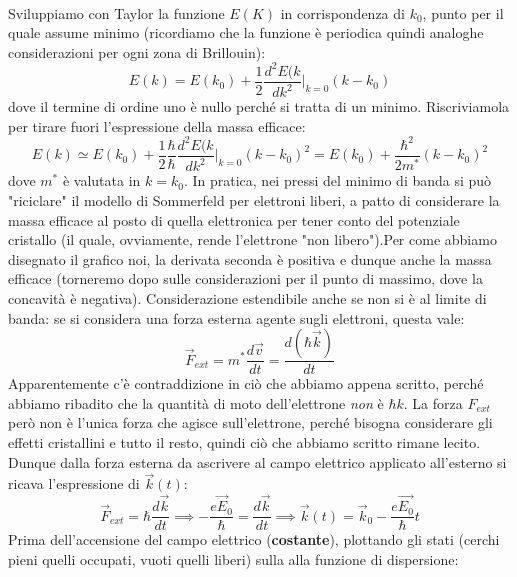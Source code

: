 \documentclass{book}
\begin{document}
                    \paragraph{}
                        Sviluppiamo con Taylor la funzione $E(K)$ in corrispondenza di $k_{0}$, punto per il quale assume minimo (ricordiamo che la funzione è periodica quindi analoghe considerazioni per ogni zona di Brillouin):
                        $$E(k) = E(k_{0}) + \frac{1}{2} \frac{d^{2}E(k}{dk^{2}}|_{k=0} (k-k_{0}) $$
                        dove il termine di ordine uno è nullo perché si tratta di un minimo.
                        Riscriviamola per tirare fuori l'espressione della massa efficace:
                        $$E(k) \simeq E(k_{0}) + \frac{1}{2}  \frac{\hbar}{\hbar}\frac{d^{2}E(k}{dk^{2}}|_{k=0} (k-k_{0})^{2} = E(k_{0}) + \frac{\hbar ^{2}}{2m^{*}}(k-k_{0})^{2} $$
                        dove $m^{*}$ è valutata in $k=k_{0}$. In pratica, nei pressi del minimo di banda si può "riciclare" il modello di Sommerfeld per elettroni liberi, a patto di considerare la massa efficace al posto di quella elettronica per tener conto del potenziale cristallo (il quale, ovviamente, rende l'elettrone "non libero").Per come abbiamo disegnato il grafico noi, la derivata seconda è positiva e dunque anche la massa efficace (torneremo dopo sulle considerazioni per il punto di massimo, dove la concavità è negativa).
                        Considerazione estendibile anche se non si è al limite di banda: se si considera una forza esterna agente sugli elettroni, questa vale:
                        $$\vec{F}_{ext} = m^{*} \frac{d \vec{v}}{dt} = \frac{d (\hbar \vec{k})}{dt}$$
                        Apparentemente c'è contraddizione in ciò che abbiamo appena scritto, perché abbiamo ribadito che la quantità di moto dell'elettrone \textit{non} è $\hbar k$. La forza $F_{ext}$ però non è l'unica forza che agisce sull'elettrone, perché bisogna considerare gli effetti cristallini e tutto il resto, quindi ciò che abbiamo scritto rimane lecito.\\
                        Dunque dalla forza esterna da ascrivere al campo elettrico applicato all'esterno si ricava l'espressione di $\vec{k}(t)$:
                        $$\vec{F}_{ext} = \hbar \frac{d\vec{k}}{dt} \implies -\frac{e\vec{E}_{0}}{\hbar} = \frac{d \vec{k}}{dt} \implies \vec{k}(t) = \vec{k}_{0}- \frac{e \vec{E_{0}}}{\hbar} t$$
                        Prima dell'accensione del campo elettrico (\textbf{costante}), plottando gli stati (cerchi pieni quelli occupati, vuoti quelli liberi) sulla alla funzione di dispersione:
\end{document}

